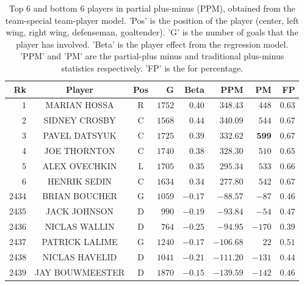 {
    \renewcommand{\arraystretch}{1.2}
    \begin{table}[htbp]
        \centering
        \begin{tabular}{r c c r r r r r }
            \hline
            Rk & Player & Pos & G & Beta & \textbf{PPM} & PM & FP \\ \hline
            1 & MARIAN HOSSA            & R & $1752$ & $0.40$ & $348.43$ & $448$ & $0.63$ \\
            2 & SIDNEY CROSBY          & C &  $1568$ & $0.44$ & $340.09$ & $544$ & $0.67$ \\
            3 & PAVEL DATSYUK          & C &  $1725$ & $0.39$ & $332.62$ & $\mathbf{599}$ & $0.67$ \\
            4 & JOE THORNTON            & C & $1740$ & $0.38$ & $328.30$ & $510$ & $0.65$ \\
            5 & ALEX OVECHKIN           & L &  $1705$ & $0.35$ &$295.34$ & $533$ & $0.66$ \\ 
            6 & HENRIK SEDIN   & C & $1634$ & $ 0.34$ & $277.80$ & $542$ & $0.67$ \\ \hline
            2434 & BRIAN BOUCHER   & G & $1059$ & $-0.17$ & $-88.57$  & $-87$ & $0.46$ \\
            2435 &  JACK JOHNSON        & D  & $990$ & $-0.19$ & $ -93.84$ & $-54$ & $ 0.47$\\
            2436 &  NICLAS WALLIN           & D  & $764$ & $-0.25$ & $ -94.95$ & $-170$ & $ 0.39$\\
            2437 &  PATRICK LALIME          & G & $1240$ & $-0.17$ & $ -106.68$ & $ 22$ & $ 0.51$\\
            2438 & NICLAS HAVELID       & D & $1041$ & $-0.21$ & $ -111.20$ & $-131$ & $ 0.44 $\\
            2439 &  JAY BOUWMEESTER         & D & $1870$ & $-0.15$ & $ -139.59$ & $-142$ & $ 0.46$\\ \hline
        \end{tabular}
        \caption{Top 6 and bottom 6 players in partial plus-minus (PPM), obtained from the team-special team-player model. 'Pos' is the position of the player (center, left wing, right wing, defenseman, goaltender). 'G' is the number of goals that the player has involved. 'Beta' is the player effect from the regression model. 'PPM' and 'PM' are the partial-plus minus and traditional plus-minus statistics respectively. 'FP' is the for percentage.  }\label{tab:goal.ppm.rank}
    \end{table}
}

